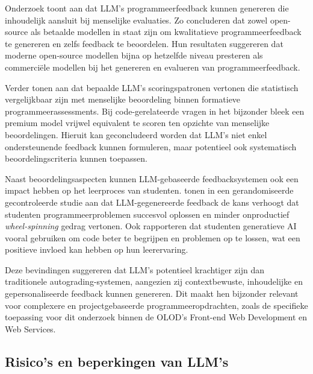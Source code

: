 \vspace{1em}

Onderzoek toont aan dat LLM's programmeerfeedback kunnen genereren die inhoudelijk aansluit bij menselijke evaluaties. Zo concluderen \textcite{Koutcheme2025} dat zowel open-source als betaalde modellen in staat zijn om kwalitatieve programmeerfeedback te genereren en zelfs feedback te beoordelen. Hun resultaten suggereren dat moderne open-source modellen bijna op hetzelfde niveau presteren als commerciële modellen bij het genereren en evalueren van programmeerfeedback.

\vspace{1em}

Verder tonen \textcite{Mendonca2025} aan dat bepaalde LLM's scoringspatronen vertonen die statistisch vergelijkbaar zijn met menselijke beoordeling binnen formatieve programmeerassessments. Bij code-gerelateerde vragen in het bijzonder bleek een premium model vrijwel equivalent te scoren ten opzichte van menselijke beoordelingen. Hieruit kan geconcludeerd worden dat LLM's niet enkel ondersteunende feedback kunnen formuleren, maar potentieel ook systematisch beoordelingscriteria kunnen toepassen.

\vspace{1em}

Naast beoordelingsaspecten kunnen LLM-gebaseerde feedbacksystemen ook een impact hebben op het leerproces van studenten. \textcite{Zhou2025} tonen in een gerandomiseerde gecontroleerde studie aan dat LLM-gegenereerde feedback de kans verhoogt dat studenten programmeerproblemen succesvol oplossen en minder onproductief \textit{wheel-spinning} gedrag vertonen. Ook \textcite{Lepp2025} rapporteren dat studenten generatieve AI vooral gebruiken om code beter te begrijpen en problemen op te lossen, wat een positieve invloed kan hebben op hun leerervaring.

\vspace{1em}

Deze bevindingen suggereren dat LLM's potentieel krachtiger zijn dan traditionele autograding-systemen, aangezien zij contextbewuste, inhoudelijke en gepersonaliseerde feedback kunnen genereren. Dit maakt hen bijzonder relevant voor complexere en projectgebaseerde programmeeropdrachten, zoals de specifieke toepassing voor dit onderzoek binnen de OLOD's Front-end Web Development en Web Services.

\subsection{Risico's en beperkingen van LLM's}

